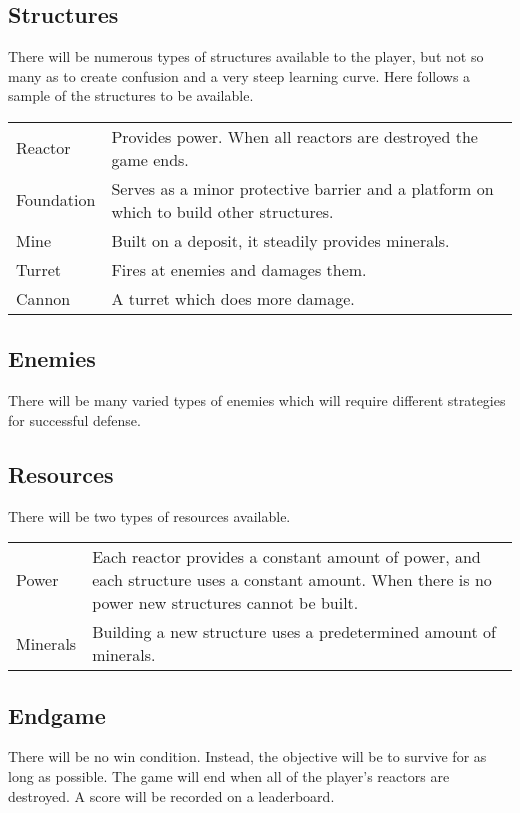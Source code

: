 \documentclass[a4paper]{article}
\begin{document}
\subsection{Structures}

There will be numerous types of structures available to the player, but not so many as to create confusion and a very steep learning curve.  Here follows a sample of the structures to be available.

\noindent
\begin{tabular}{p{2cm}p{9cm}}
Reactor & Provides power.  When all reactors are destroyed the game ends. \\
Foundation & Serves as a minor protective barrier and a platform on which to build other structures. \\
Mine & Built on a deposit, it steadily provides minerals. \\
Turret & Fires at enemies and damages them. \\
Cannon & A turret which does more damage.
\end{tabular}

\subsection{Enemies}

There will be many varied types of enemies which will require different strategies for successful defense.

\subsection{Resources}

There will be two types of resources available.

\noindent
\begin{tabular}{p{2cm}p{9cm}}
Power & Each reactor provides a constant amount of power, and each structure uses a constant amount.  When there is no power new structures cannot be built. \\
Minerals & Building a new structure uses a predetermined amount of minerals.
\end{tabular}

\subsection{Endgame}

There will be no win condition.  Instead, the objective will be to survive for as long as possible.  The game will end when all of the player's reactors are destroyed.  A score will be recorded on a leaderboard.
\end{document}
